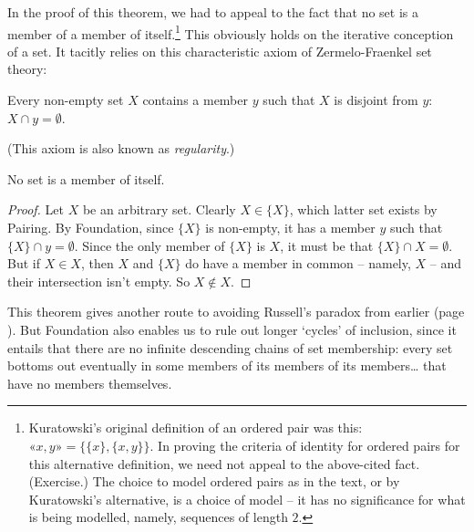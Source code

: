 In the proof of this theorem, we had to appeal to the fact that no set is a member of a member of itself.\footnote{Kuratowski's original definition of an ordered pair was this: $« x,y» = \{\{x\},\{x,y\}\}$. In proving the criteria of identity for ordered pairs for this alternative definition, we need not appeal to the above-cited fact. (Exercise.) The choice to model ordered pairs as in the text, or by Kuratowski's alternative, is a choice of model – it has no significance for what is being modelled, namely, sequences of length $2$.} This obviously holds on the iterative conception of a set. It tacitly relies on this characteristic axiom of Zermelo-Fraenkel set theory: \begin{axiom}[Foundation]
	 Every non-empty set $X$ contains a member $y$  such that $X$ is disjoint from $y$: $X \cap y = \emptyset$.
\end{axiom} (This axiom is also known as \emph{regularity}.) \begin{theorem}
	No set is a member of itself. \begin{proof}
		Let $X$ be an arbitrary set. Clearly $X \in \{X\}$, which latter set exists by Pairing. By Foundation, since $\{X\}$ is non-empty, it has a member $y$ such that $\{X\} \cap y = \emptyset$. Since the only member of $\{X\}$ is $X$, it must be that $\{X\} \cap X = \emptyset$. But if $X\in X$, then $X$ and $\{X\}$ do have a member in common – namely, $X$ – and their intersection isn't empty. So $X \notin X$.
	\end{proof} 
\end{theorem} This theorem gives another route to avoiding Russell's paradox from earlier (page \pageref{russ}). But Foundation also enables us to rule out longer `cycles' of inclusion, since it entails that there are no infinite descending chains of set membership: every set bottoms out eventually in some members of its members of its members… that have no members themselves.

